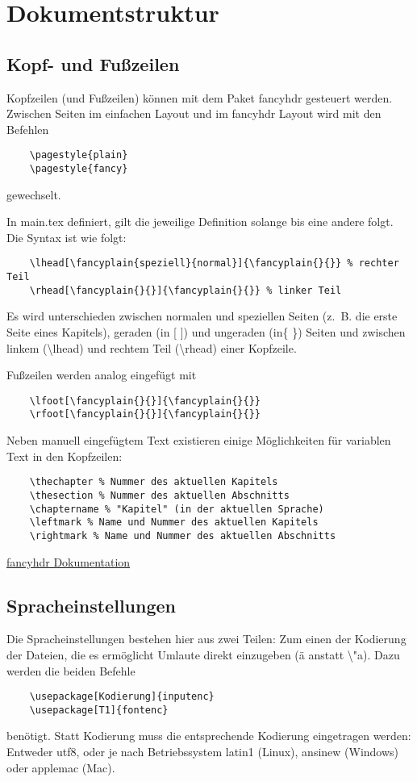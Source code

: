 \chapter{Dokumentstruktur}\label{Kap:Struktur}

\section{Kopf- und Fußzeilen}
Kopfzeilen (und Fußzeilen) können mit dem Paket fancyhdr gesteuert werden. Zwischen Seiten im einfachen Layout und im fancyhdr Layout wird mit den Befehlen
\begin{verbatim}
	\pagestyle{plain}
	\pagestyle{fancy}
\end{verbatim}
gewechselt.

In \glqq{}main.tex\grqq{} definiert, gilt die jeweilige Definition solange bis eine andere folgt. Die Syntax ist wie folgt:
\begin{verbatim}
	\lhead[\fancyplain{speziell}{normal}]{\fancyplain{}{}} % rechter Teil
	\rhead[\fancyplain{}{}]{\fancyplain{}{}} % linker Teil
\end{verbatim}
Es wird unterschieden zwischen normalen und speziellen Seiten (z.~B. die erste Seite eines Kapitels), geraden (in [ ]) und ungeraden (in\{ \}) Seiten und zwischen linkem (\textbackslash lhead) und rechtem Teil (\textbackslash rhead) einer Kopfzeile.

Fußzeilen werden analog eingefügt mit
\begin{verbatim}
	\lfoot[\fancyplain{}{}]{\fancyplain{}{}}
	\rfoot[\fancyplain{}{}]{\fancyplain{}{}}
\end{verbatim}

Neben manuell eingefügtem Text existieren einige Möglichkeiten für variablen Text in den Kopfzeilen:
\begin{verbatim}
	\thechapter % Nummer des aktuellen Kapitels
	\thesection % Nummer des aktuellen Abschnitts
	\chaptername % "Kapitel" (in der aktuellen Sprache)
	\leftmark % Name und Nummer des aktuellen Kapitels
	\rightmark % Name und Nummer des aktuellen Abschnitts
\end{verbatim}

\hyperlink{https://ctan.org/pkg/fancyhdr?lang=de}{fancyhdr Dokumentation}

\section{Spracheinstellungen}
Die Spracheinstellungen bestehen hier aus zwei Teilen: Zum einen der Kodierung der Dateien, die es ermöglicht Umlaute direkt einzugeben (\glqq{}ä\grqq{} anstatt \glqq{}\textbackslash "a\grqq{}). Dazu werden die beiden Befehle
\begin{verbatim}
	\usepackage[Kodierung]{inputenc}
	\usepackage[T1]{fontenc}
\end{verbatim}
benötigt. Statt Kodierung muss die entsprechende Kodierung eingetragen werden: Entweder \glqq{}utf8\grqq{}, oder je nach Betriebssystem \glqq{}latin1\grqq{} (Linux), \glqq{}ansinew\grqq{} (Windows) oder \glqq{}applemac\grqq{} (Mac).

